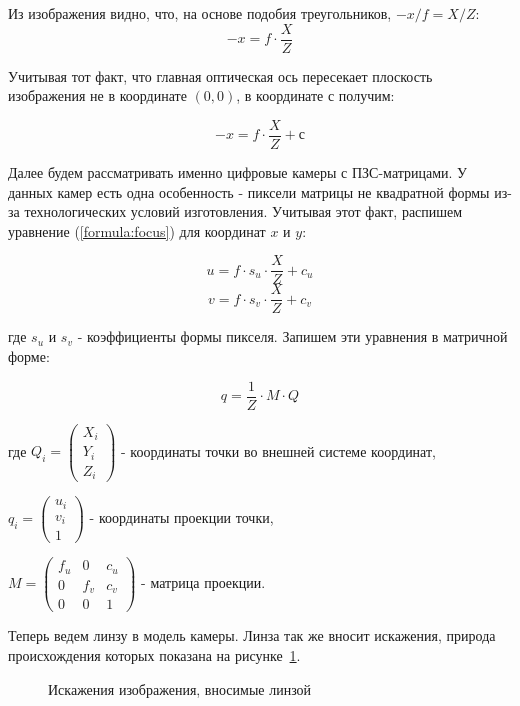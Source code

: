 Из изображения видно, что, на основе подобия треугольников, $-x/f = X/Z$:
$$	-x = f \cdot \frac{X}{Z} $$

Учитывая тот факт, что главная оптическая ось пересекает плоскость изображения не в координате $(0,0)$, в координате $с$ получим:

\begin{equation}
\label{formula:focus}
-x = f \cdot \frac{X}{Z} + с
\end{equation}

Далее будем рассматривать именно цифровые камеры с ПЗС-матрицами. У данных камер есть одна особенность - пиксели матрицы не квадратной формы из-за технологических условий изготовления. Учитывая этот факт, распишем уравнение (\ref{formula:focus}) для координат $x$ и $y$:

$$ u = f \cdot s_u \cdot \frac{X}{Z} + c_u $$
$$ v = f \cdot s_v \cdot \frac{X}{Z} + c_v $$

где $s_u$ и $s_v$ - коэффициенты формы пикселя.
Запишем эти уравнения в матричной форме:

\begin{equation}
\label{formula:matrixProection}
q = \frac{1}{Z} \cdot M \cdot Q
\end{equation}

где 
$Q_i = 
\left( 
\begin{array}{c}
X_i \\ 
Y_i \\ 
Z_i
\end{array} 
\right)$ - координаты точки во внешней системе координат,

$q_i = 
\left( 
\begin{array}{c}
u_i \\ 
v_i \\ 
1
\end{array} 
\right)$ - координаты проекции точки,

$M = 
\left( 
\begin{array}{ccc}
f_u & 0 & c_u \\ 
0 & f_v & c_v \\ 
0 & 0 & 1
\end{array} 
\right)$ - матрица проекции.

Теперь ведем линзу в модель камеры. Линза так же вносит искажения, природа происхождения которых показана на рисунке~\ref{pic:distorb}.

\begin{figure}[!htb]
\caption{Искажения изображения, вносимые линзой}
\label{pic:distorb}
\end{figure}

